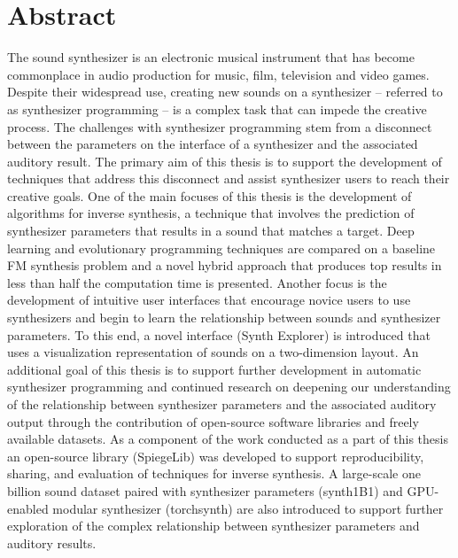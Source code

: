 \newpage
{}

\chapter*{Abstract}
The sound synthesizer is an electronic musical instrument that has become commonplace in audio production for music, film, television and video games. Despite their widespread use, creating new sounds on a synthesizer -- referred to as synthesizer programming -- is a complex task that can impede the creative process. The challenges with synthesizer programming stem from a disconnect between the parameters on the interface of a synthesizer and the associated auditory result. The primary aim of this thesis is to support the development of techniques that address this disconnect and assist synthesizer users to reach their creative goals. One of the main focuses of this thesis is the development of algorithms for inverse synthesis, a technique that involves the prediction of synthesizer parameters that results in a sound that matches a target. Deep learning and evolutionary programming techniques are compared on a baseline FM synthesis problem and a novel hybrid approach that produces top results in less than half the computation time is presented. Another focus is the development of intuitive user interfaces that encourage novice users to use synthesizers and begin to learn the relationship between sounds and synthesizer parameters. To this end, a novel interface (Synth Explorer) is introduced that uses a visualization representation of sounds on a two-dimension layout. An additional goal of this thesis is to support further development in automatic synthesizer programming and continued research on deepening our understanding of the relationship between synthesizer parameters and the associated auditory output through the contribution of open-source software libraries and freely available datasets. As a component of the work conducted as a part of this thesis an open-source library (SpiegeLib) was developed to support reproducibility, sharing, and evaluation of techniques for inverse synthesis. A large-scale one billion sound dataset paired with synthesizer parameters (synth1B1) and GPU-enabled modular synthesizer (torchsynth) are also introduced to support further exploration of the complex relationship between synthesizer parameters and auditory results.




